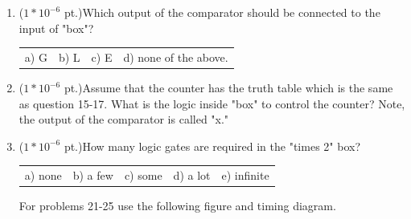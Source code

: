 \documentclass{article}
\begin{document}
\begin{enumerate}
\item {($1*10^{-6}$ pt.)}Which output of the comparator should be connected
to the input of "box"?

\begin{tabular}{p{0.6in} p{0.6in} p{0.6in} l}
a) G & b) L & c) E & d) none of the above.  
\end{tabular}

\item {($1*10^{-6}$ pt.)}Assume that the counter has the truth table
which is the same as question 15-17.  What is the logic inside "box"
to control the counter?  Note, the output of the comparator is called "x."


\item {($1*10^{-6}$ pt.)}How many logic gates are required in the "times 2" box?

\begin{tabular}{p{0.6in} p{0.6in} p{0.6in} p{0.6in} l}
a) none & b) a few & c) some & d) a lot & e) infinite  
\end{tabular}

\pagebreak
For problems 21-25 use the following figure and timing diagram.


\end{enumerate}
\end{document}
